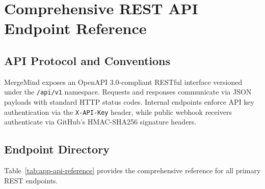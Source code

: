 \chapter{Comprehensive REST API Endpoint Reference}
\label{app:api-reference}

\section{API Protocol and Conventions}

MergeMind exposes an OpenAPI 3.0-compliant RESTful interface versioned under the \texttt{/api/v1} namespace. Requests and responses communicate via JSON payloads with standard HTTP status codes. Internal endpoints enforce API key authentication via the \texttt{X-API-Key} header, while public webhook receivers authenticate via GitHub's HMAC-SHA256 signature headers.

\section{Endpoint Directory}

Table~\ref{tab:app-api-reference} provides the comprehensive reference for all primary REST endpoints.

